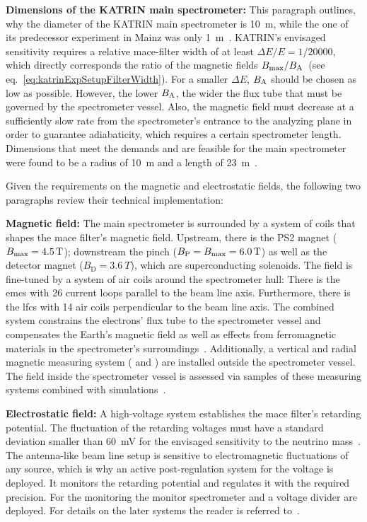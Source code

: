{{\par \textbf{Dimensions of the KATRIN main spectrometer:} This paragraph outlines, why the diameter of the KATRIN main spectrometer is \SI{10}{m}, while the one of its predecessor experiment in Mainz was only \SI{1}{m}~\cite{Kraus2005}. KATRIN's envisaged sensitivity requires a relative \gls{mace}-filter width of at least $\Delta E/E = 1/20000$, which directly corresponds the ratio of the magnetic fields $B_\mathrm{max}/B_\mathrm{A}$~(see eq.~\ref{eq:katrinExpSetupFilterWidth}). For a smaller $\Delta E$, $B_\mathrm{A}$ should be chosen as low as possible. However, the lower $B_\mathrm{A}$, the wider the flux tube that must be governed by the spectrometer vessel. Also, the magnetic field must decrease at a sufficiently slow rate from the spectrometer's entrance to the analyzing plane in order to guarantee adiabaticity, which requires a certain spectrometer length. Dimensions that meet the demands and are feasible for the main spectrometer were found to be a radius of \SI{10}{m} and a length of \SI{23}{m}~\cite{Angrik:2005ep, Valerius2004}.}

Given the requirements on the magnetic and electrostatic fields, the following two paragraphs review their technical implementation:

{\par \textbf{Magnetic field:} The main spectrometer is surrounded by a system of coils that shapes the \gls{mace} filter's  magnetic field. Upstream, there is the PS2 magnet ($B_\mathrm{max}=\SI{4.5}{T}$); downstream the pinch ($B_\mathrm{P}=B_\mathrm{max}=\SI{6.0}{T}$) as well as the detector magnet ($B_\mathrm{D}=\SI{3.6}{T}$), which are superconducting solenoids. The field is fine-tuned by a system of air coils around the spectrometer hull: There is the \gls{emcs} with 26 current loops parallel to the beam line axis. Furthermore, there is the \gls{lfcs} with 14 air coils perpendicular to the beam line axis. The combined system constrains the electrons' flux tube to the spectrometer vessel and compensates the Earth's magnetic field as well as effects from ferromagnetic materials in the spectrometer's surroundings~\cite{Erhard2018}. Additionally, a vertical and radial magnetic measuring system ( and ) are installed outside the spectrometer vessel. The field inside the spectrometer vessel is assessed via samples of these measuring systems combined with simulations~\cite{Letnev2018}.}

{\par \textbf{Electrostatic field:} A high-voltage system establishes the \gls{mace} filter's retarding potential. The fluctuation of the retarding voltages must have a standard deviation smaller than \SI{60}{mV} for the envisaged sensitivity to the neutrino mass~\cite{Angrik:2005ep}. The antenna-like beam line setup is sensitive to electromagnetic fluctuations of any source, which is why an active post-regulation system for the voltage is deployed. It monitors the retarding potential and regulates it with the required precision. For the monitoring the monitor spectrometer and a voltage divider are deployed. For details on the later systems the reader is referred to~\cite{Thuemmler2009,Erhard2014,Zboril2011}.}

}
